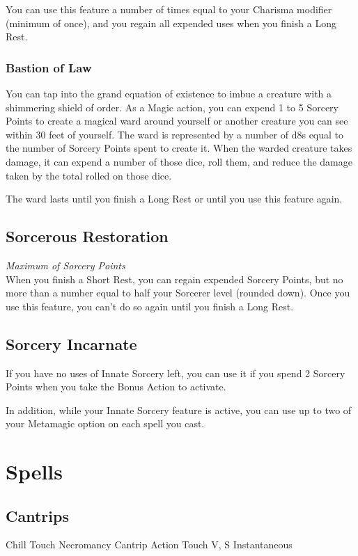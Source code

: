 \documentclass[letterpaper,openany,oneside,twocolumn]{book}
\begin{document}
You can use this feature a number of times equal to your Charisma modifier (minimum of once), and you regain all expended uses when you finish a Long Rest.
\subsubsection*{Bastion of Law}
You can tap into the grand equation of existence to imbue a creature with a shimmering shield of order. As a Magic action, you can expend 1 to 5 Sorcery Points to create a magical ward around yourself or another creature you can see within 30 feet of yourself. The ward is represented by a number of d8s equal to the number of Sorcery Points spent to create it. When the warded creature takes damage, it can expend a number of those dice, roll them, and reduce the damage taken by the total rolled on those dice.

The ward lasts until you finish a Long Rest or until you use this feature again.

\subsection*{Sorcerous Restoration}
\textit{Maximum of \intcalcShr{\LevelValue} Sorcery Points}\\
When you finish a Short Rest, you can regain expended Sorcery Points, but no more than a number equal to half your Sorcerer level (rounded down). Once you use this feature, you can't do so again until you finish a Long Rest.

\subsection*{Sorcery Incarnate}
If you have no uses of Innate Sorcery left, you can use it if you spend 2 Sorcery Points when you take the Bonus Action to activate.

In addition, while your Innate Sorcery feature is active, you can use up to two of your Metamagic option on each spell you cast.

\section*{Spells}
\subsection*{Cantrips}

\DndSpellHeader
  {Chill Touch}
  {Necromancy Cantrip}
  {Action}
  {Touch}
  {V, S}
  {Instantaneous}
\end{document}
